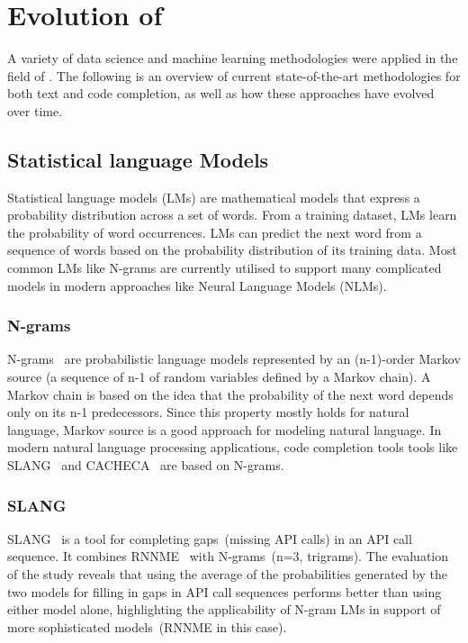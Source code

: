 \section{Evolution of \cct{}}
A variety of data science and machine learning methodologies were applied in the field of \cct{}. The following is an overview of current state-of-the-art methodologies for both text and code completion, as well as how these approaches have evolved over time.

\subsection{Statistical language Models}
Statistical language models (LMs) are mathematical models that express a probability distribution across a set of words. From a training dataset, LMs learn the probability of word occurrences. LMs can predict the next word from a sequence of words based on the probability distribution of its training data. Most common LMs like N-grams are currently utilised to support many complicated models in modern approaches like Neural Language Models (NLMs).

\subsubsection{N-grams}
N-grams~\cite{ngram} are probabilistic language models represented by an (n-1)-order Markov source (a sequence of n-1 of random variables defined by a Markov chain). A Markov chain is based on the idea that the probability of the next word depends only on its n-1 predecessors. Since this property mostly holds for natural language, Markov source is a good approach for modeling natural language. In modern natural language processing applications, 
code completion tools tools like SLANG~\cite{slang} and CACHECA~\cite{cacheca} are based on N-grams.

\subsubsection{SLANG}
SLANG~\cite{slang} is a tool for completing gaps~(missing API calls) in an API call sequence. It combines RNNME~\cite{rnnme} with N-grams~(n=3, trigrams). 
The evaluation of the study reveals that using the average of the probabilities generated by the two models for filling in gaps in API call sequences performs better than using either model alone, highlighting the applicability of N-gram LMs in support of more sophisticated models~(RNNME in this case).

